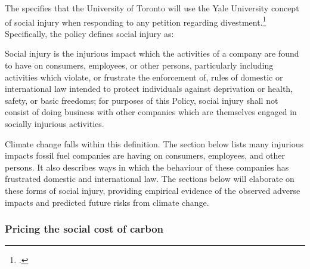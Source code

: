 The  specifies that the University of Toronto will use the Yale University concept of social injury when responding to any petition regarding divestment.\footcite[See also: ][]{EthicalInvestor}
Specifically, the policy defines social injury as:
\begin{itquote}
Social injury is the injurious impact which the activities of a company are found to have on consumers, employees, or other persons, particularly including activities which violate, or frustrate the enforcement of, rules of domestic or international law intended to protect individuals against deprivation or health, safety, or basic freedoms; for purposes of this Policy, social injury shall not consist of doing business with other companies which are themselves engaged in socially injurious activities.
\end{itquote}
Climate change falls within this definition.
The section below lists many injurious impacts fossil fuel companies are having on consumers, employees, and other persons.
It also describes ways in which the behaviour of these companies has frustrated domestic and international law.
The sections below will elaborate on these forms of social injury, providing empirical evidence of the observed adverse impacts and predicted future risks from climate change.



	\subsubsection{Pricing the social cost of carbon}
	\label{sec:PricingSocialCost}



